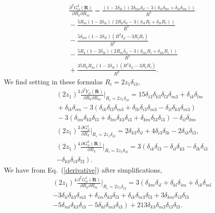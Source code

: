 \begin{eqnarray}&&\!\!\!\!\!\!\!\!
\frac{\partial^2 G^2_{il}(\bm R)}{\partial R_k \partial R_m}=\frac{\left(1\!-\!2\delta_{3l}\right)\left(2\delta_{km}\delta_{il}\!-\!3\left(\delta_{ik}\delta_{lm}+\delta_{lk}\delta_{im}\right)\right)}{R^5}
\nonumber\\&&\!\!\!\!\!\!\!\!
-\frac{5R_m\left(1\!-\!2\delta_{3l}\right)\left(2R_k\delta_{il}\!-\!3\left(\delta_{ik}R_l+\delta_{lk}R_i\right)\right)}{R^7}
\nonumber\\&&\!\!\!\!\!\!\!\!
-\frac{5\delta_{km}\left(1\!-\!2\delta_{3l}\right)\left(R^2\delta_{il}\!-\!3R_iR_l\right)}{R^7}
\nonumber\\&&\!\!\!\!\!\!\!\!
-\frac{5R_k\left(1\!-\!2\delta_{3l}\right)\left(2R_m\delta_{il}\!-\!3\left(\delta_{im}R_l+\delta_{lm}R_i\right)\right)}{R^7}\nonumber\\&&\!\!\!\!\!\!\!\!
+\frac{35R_kR_m\left(1\!-\!2\delta_{3l}\right)\left(R^2\delta_{il}\!-\!3R_iR_l\right)}{R^9}.
\end{eqnarray}
We find setting in these formulas $R_i=2z_1\delta_{i3}$,
\begin{eqnarray}&&\!\!\!\!\!\!\!\!\!\!\!\!\!\!\!\!
(2z_1)^3\frac{\partial^2 Y_{il}(\bm R)}{\partial R_k \partial R_m}|_{R_i=2z_1\delta_{i3}}=15\delta_{i3}\delta_{k3}\delta_{l3}\delta_{m3}+\delta_{ik}\delta_{lm}
\nonumber\\&&\!\!\!\!\!\!\!\!\!\!\!\!\!\!\!\!
+\delta_{lk}\delta_{im}
-3\left(\delta_{ik}\delta_{l3}\delta_{m3}+\delta_{lk}\delta_{i3}\delta_{m3}-\delta_{il}\delta_{k3}\delta_{m3}\right)
\nonumber\\&&\!\!\!\!\!\!\!\!\!\!\!\!\!\!\!\!
-3\left(\delta_{im}\delta_{k3}\delta_{l3}+\delta_{lm}\delta_{k3}\delta_{i3}+\delta_{km}\delta_{l3}\delta_{i3}\right)-\delta_{il}\delta_{km}\nonumber\\&&\!\!\!\!\!\!\!\!\!\!\!\!\!\!\!\!
(2z_1)^3\frac{\partial G^1_{il}}{\partial R_k}|_{R_i=2z_1\delta_{i3}}=2\delta_{k3}\delta_{il}\!+\!4\delta_{i3}\delta_{lk}-2\delta_{ik}\delta_{l3},
\nonumber\\&&\!\!\!\!\!\!\!\!\!\!\!\!\!\!\!\!
(2z_1)^4\frac{\partial G^2_{il}(\bm R)}{\partial R_k}|_{R_i=2z_1\delta_{i3}}=3\left(\delta_{ik}\delta_{l3}-\delta_{il}\delta_{k3}-\delta_{lk}\delta_{i3}
\right.\nonumber\\&&\!\!\!\!\!\!\!\!\!\!\!\!\!\!\!\!\left.
-\delta_{k3}\delta_{i3}\delta_{l3}\right).
\end{eqnarray}
We have from Eq.~(\ref{derivative}) after simplifications,
\begin{eqnarray}&&\!\!\!\!\!\!\!\!\!\!
(2z_1)^4\frac{\partial^2 G^1_{il}(\bm R)}{\partial R_k \partial R_m}|_{R_i=2z_1\delta_{i3}}=3\left(
\delta_{km}\delta_{il}+\delta_{kl}\delta_{im}+\delta_{ik}\delta_{ml}\!\right.\nonumber\\&&\!\!\!\!\!\!\!\!\!\!\left.
-3\delta_{il}\delta_{k3}\delta_{m3}\!+\!\delta_{im}\delta_{k3}\delta_{l3}\!+\!\delta_{ik}\delta_{m3}\delta_{l3}
+3\delta_{km}\delta_{i3}\delta_{l3}
\right.\nonumber\\&&\!\!\!\!\!\!\!\!\!\!\left.
-5\delta_{ml}\delta_{k3} \delta_{i3}-5\delta_{kl} \delta_{m3}\delta_{i3}\right)+213 \delta_{k3} \delta_{m3} \delta_{i3} \delta_{l3}.
\end{eqnarray}

